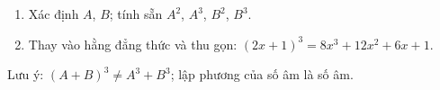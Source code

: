 \begin{enumerate}
\item Xác định $A$, $B$; tính sẵn $A^2$, $A^3$, $B^2$, $B^3$.
\item Thay vào hằng đẳng thức và thu gọn: $(2x+1)^3=8x^3+12x^2+6x+1$.
\end{enumerate}
Lưu ý: $(A+B)^3\ne A^3+B^3$; lập phương của số âm là số âm.
